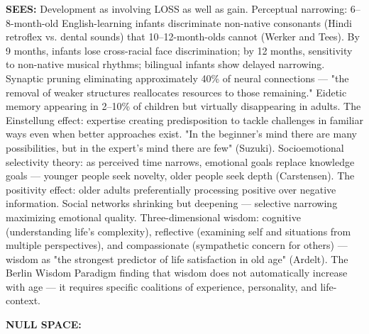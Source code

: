 \textbf{SEES:} Development as involving LOSS as well as gain. Perceptual narrowing: 6–8-month-old English-learning infants discriminate non-native consonants (Hindi retroflex vs. dental sounds) that 10–12-month-olds cannot (Werker and Tees). By 9 months, infants lose cross-racial face discrimination; by 12 months, sensitivity to non-native musical rhythms; bilingual infants show delayed narrowing. Synaptic pruning eliminating approximately 40\% of neural connections — "the removal of weaker structures reallocates resources to those remaining." Eidetic memory appearing in 2–10\% of children but virtually disappearing in adults. The Einstellung effect: expertise creating predisposition to tackle challenges in familiar ways even when better approaches exist. "In the beginner's mind there are many possibilities, but in the expert's mind there are few" (Suzuki). Socioemotional selectivity theory: as perceived time narrows, emotional goals replace knowledge goals — younger people seek novelty, older people seek depth (Carstensen). The positivity effect: older adults preferentially processing positive over negative information. Social networks shrinking but deepening — selective narrowing maximizing emotional quality. Three-dimensional wisdom: cognitive (understanding life's complexity), reflective (examining self and situations from multiple perspectives), and compassionate (sympathetic concern for others) — wisdom as "the strongest predictor of life satisfaction in old age" (Ardelt). The Berlin Wisdom Paradigm finding that wisdom does not automatically increase with age — it requires specific coalitions of experience, personality, and life-context.


\textbf{NULL SPACE:}


